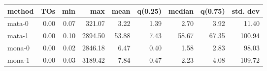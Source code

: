 \begin{tabular}{lrrrrrrrr}
\hline
 method   &   TOs &   min &     max &   mean &   q(0.25) &   median &   q(0.75) &   std. dev \\
\hline
 mata-0   &  0.00 &  0.07 &  321.07 &   3.22 &      1.39 &     2.70 &      3.92 &      11.40 \\
 mata-1   &  0.00 &  0.10 & 2894.50 &  53.88 &      7.43 &    58.67 &     67.35 &     100.94 \\
 mona-0   &  0.00 &  0.02 & 2846.18 &   6.47 &      0.40 &     1.58 &      2.83 &      98.03 \\
 mona-1   &  0.00 &  0.03 & 3189.42 &   7.84 &      0.47 &     2.23 &      4.08 &     109.72 \\
\hline
\end{tabular}
